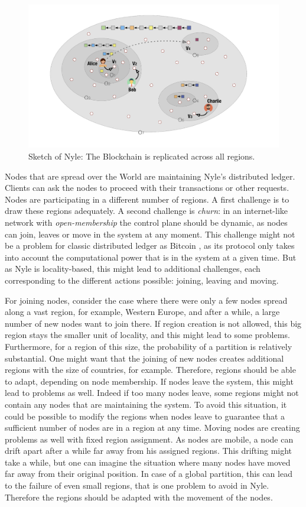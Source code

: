 \documentclass[a4paper,11pt,twoside=semi,openright]{report}
\begin{document}
\begin{figure}[!h] \centering \includegraphics[width=400pt]{figures/Nyle}
    \caption{Sketch of Nyle: The Blockchain is replicated across all regions.}
\label{fig:Nyle}
\end{figure}

Nodes that are spread over the World are maintaining Nyle's distributed ledger.
Clients can ask the nodes to proceed with their transactions or other requests.
Nodes are participating in a different number of regions. A first challenge is
to draw these regions adequately. A second challenge is \textit{churn}: in an
internet-like network with \textit{open-membership} the control plane should be
dynamic, as nodes can join, leaves or move in the system at any moment. This
challenge might not be a problem for classic distributed ledger as Bitcoin
\cite{Nakamoto2009}, as its protocol only takes into account the computational
power that is in the system at a given time. But as Nyle is locality-based,
this might lead to additional challenges, each corresponding to the different
actions possible: joining, leaving and moving.

For joining nodes, consider the case where there were only a few nodes spread
along a vast region, for example, Western Europe, and after a while, a large
number of new nodes want to join there. If region creation is not allowed, this
big region stays the smaller unit of locality, and this might lead to some
problems.  Furthermore, for a region of this size, the probability of a
partition is relatively substantial. One might want that the joining of new
nodes creates additional regions with the size of countries, for example.
Therefore, regions should be able to adapt, depending on node membership. If
nodes leave the system, this might lead to problems as well. Indeed if too many
nodes leave, some regions might not contain any nodes that are maintaining the
system. To avoid this situation, it could be possible to modify the regions
when nodes leave to guarantee that a sufficient number of nodes are in a region
at any time. Moving nodes are creating problems as well with fixed region
assignment. As nodes are mobile, a node can drift apart after a while far away
from his assigned regions. This drifting might take a while, but one can
imagine the situation where many nodes have moved far away from their original
position. In case of a global partition, this can lead to the failure of even
small regions, that is one problem to avoid in Nyle. Therefore the regions
should be adapted with the movement of the nodes. 
\end{document}
